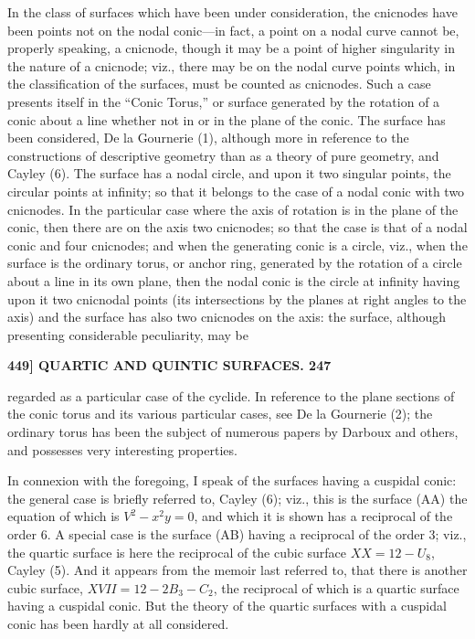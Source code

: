\documentclass[11pt]{article}
\begin{document}
In the class of surfaces which have been under consideration, the cnicnodes have
been points not on the nodal conic---in fact, a point on a nodal curve cannot be,
properly speaking, a cnicnode, though it may be a point of higher singularity in the
nature of a cnicnode; viz., there may be on the nodal curve points which, in the
classification of the surfaces, must be counted as cnicnodes. Such a case presents itself
in the ``Conic Torus,'' or surface generated by the rotation of a conic about a line
whether not in or in the plane of the conic. The surface has been considered,
De la Gournerie (1), although more in reference to the constructions of descriptive
geometry than as a theory of pure geometry, and Cayley (6). The surface has a
nodal circle, and upon it two singular points, the circular points at infinity; so that
it belongs to the case of a nodal conic with two cnicnodes. In the particular case
where the axis of rotation is in the plane of the conic, then there are on the axis
two cnicnodes; so that the case is that of a nodal conic and four cnicnodes; and
when the generating conic is a circle, viz., when the surface is the ordinary torus, or
anchor ring, generated by the rotation of a circle about a line in its own plane, then
the nodal conic is the circle at infinity having upon it two cnicnodal points (its inter\-sections by the planes at right angles to the axis) and the surface has also two
cnicnodes on the axis: the surface, although presenting considerable peculiarity, may be

\medskip
\noindent\textbf{449] \quad QUARTIC AND QUINTIC SURFACES. \hfill 247}

\medskip

regarded as a particular case of the cyclide. In reference to the plane sections of the
conic torus and its various particular cases, see De la Gournerie (2); the ordinary
torus has been the subject of numerous papers by Darboux and others, and possesses
very interesting properties.

In connexion with the foregoing, I speak of the surfaces having a cuspidal conic:
the general case is briefly referred to, Cayley (6); viz., this is the surface (AA) the
equation of which is $V^2 - x^2y = 0$, and which it is shown has a reciprocal of the order 6.
A special case is the surface (AB) having a reciprocal of the order 3; viz., the
quartic surface is here the reciprocal of the cubic surface $XX = 12 - U_8$, Cayley (5).
And it appears from the memoir last referred to, that there is another cubic surface,
$XVII = 12 - 2B_3 - C_2$, the reciprocal of which is a quartic surface having a cuspidal
conic. But the theory of the quartic surfaces with a cuspidal conic has been hardly
at all considered.
\end{document}
